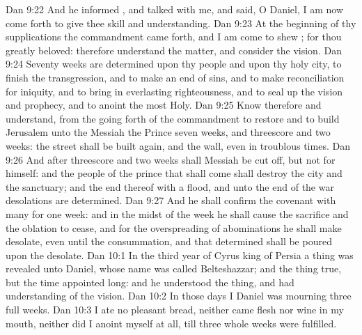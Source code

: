 \vs Dan 9:22 And he informed , and talked with me, and said, O Daniel, I am now come forth to give thee skill and understanding.
\vs Dan 9:23 At the beginning of thy supplications the commandment came forth, and I am come to shew ; for thou  greatly beloved: therefore understand the matter, and consider the vision.
\vs Dan 9:24 Seventy weeks are determined upon thy people and upon thy holy city, to finish the transgression, and to make an end of sins, and to make reconciliation for iniquity, and to bring in everlasting righteousness, and to seal up the vision and prophecy, and to anoint the most Holy.
\vs Dan 9:25 Know therefore and understand,  from the going forth of the commandment to restore and to build Jerusalem unto the Messiah the Prince  seven weeks, and threescore and two weeks: the street shall be built again, and the wall, even in troublous times.
\vs Dan 9:26 And after threescore and two weeks shall Messiah be cut off, but not for himself: and the people of the prince that shall come shall destroy the city and the sanctuary; and the end thereof  with a flood, and unto the end of the war desolations are determined.
\vs Dan 9:27 And he shall confirm the covenant with many for one week: and in the midst of the week he shall cause the sacrifice and the oblation to cease, and for the overspreading of abominations he shall make  desolate, even until the consummation, and that determined shall be poured upon the desolate.
\vs Dan 10:1 In the third year of Cyrus king of Persia a thing was revealed unto Daniel, whose name was called Belteshazzar; and the thing  true, but the time appointed  long: and he understood the thing, and had understanding of the vision.
\vs Dan 10:2 In those days I Daniel was mourning three full weeks.
\vs Dan 10:3 I ate no pleasant bread, neither came flesh nor wine in my mouth, neither did I anoint myself at all, till three whole weeks were fulfilled.
